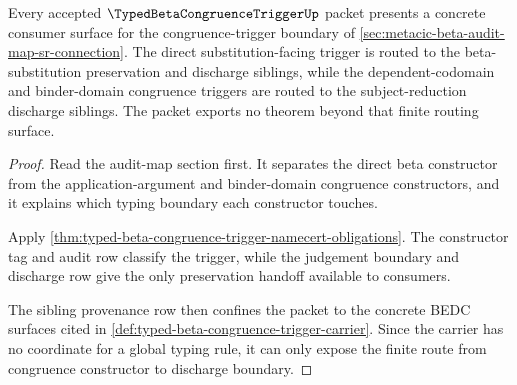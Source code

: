 \begin{theorem}
\label{thm:typed-beta-congruence-trigger-audit-map-fit}
Every accepted $\TypedBetaCongruenceTriggerUp$ packet presents a concrete consumer surface for the congruence-trigger boundary of \autoref{sec:metacic-beta-audit-map-sr-connection}. The direct substitution-facing trigger is routed to the beta-substitution preservation and discharge siblings, while the dependent-codomain and binder-domain congruence triggers are routed to the subject-reduction discharge siblings. The packet exports no theorem beyond that finite routing surface.
\end{theorem}
\begin{proof}
Read the audit-map section first. It separates the direct beta constructor from the application-argument and binder-domain congruence constructors, and it explains which typing boundary each constructor touches.

Apply \autoref{thm:typed-beta-congruence-trigger-namecert-obligations}. The constructor tag and audit row classify the trigger, while the judgement boundary and discharge row give the only preservation handoff available to consumers.

The sibling provenance row then confines the packet to the concrete BEDC surfaces cited in \autoref{def:typed-beta-congruence-trigger-carrier}. Since the carrier has no coordinate for a global typing rule, it can only expose the finite route from congruence constructor to discharge boundary.
\end{proof}


\begin{closurestatus}{\TypedBetaCongruenceTriggerUp}
  \theoryclosure{\seedClosure}
  \formalstatus{\unformalizedV}
\end{closurestatus}
